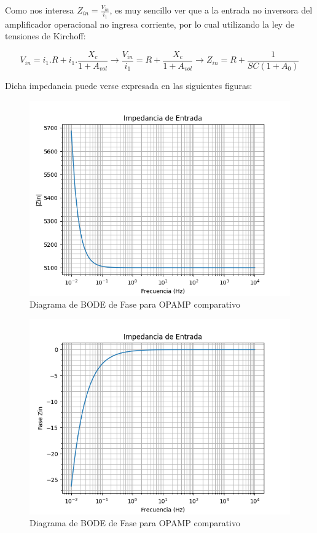 Como nos interesa $Z_{in}=\frac{V_{in}}{i_1}$, es muy sencillo ver que a la entrada no inversora del amplificador operacional no ingresa corriente,
por lo cual utilizando la ley de tensiones de Kirchoff:

$$ V_{in} = i_1.R + i_1.\frac{X_c}{1+A_{vol}} \longrightarrow \frac{V_{in}}{i_1}= R + \frac{X_c}{1+A_{vol}} \longrightarrow Z_{in}=R+\frac{1}{SC(1+A_0)}$$

Dicha impedancia puede verse expresada en las siguientes figuras:

\begin{figure}[H]
    \centering 
    \includegraphics [scale=1] {../Ejercicio3-CircuitoIntegradoresyDerivadores/Imagenes/zin-magnitud.png} 
    \caption{Diagrama de BODE de Fase para OPAMP comparativo }
    \label{fig:emptyPlotTool}
\end{figure}

\begin{figure}[H]
    \centering 
    \includegraphics [scale=1] {../Ejercicio3-CircuitoIntegradoresyDerivadores/Imagenes/zin-fase.png} 
    \caption{Diagrama de BODE de Fase para OPAMP comparativo }
    \label{fig:emptyPlotTool}
\end{figure}

